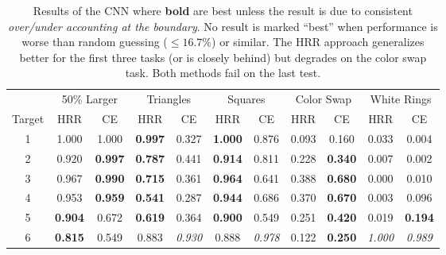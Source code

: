 \documentclass[letterpaper]{article} %
\begin{document}
\begin{table}[!t]
\centering
\begin{tabular}{@{}ccccccccccc@{}}
\toprule
       & \multicolumn{2}{c}{50\% Larger} & \multicolumn{2}{c}{Triangles}   & \multicolumn{2}{c}{Squares}     & \multicolumn{2}{c}{Color Swap} & \multicolumn{2}{c}{White Rings} \\ \cmidrule(r){2-3} \cmidrule(r){4-5} \cmidrule(lr){6-7} \cmidrule(r){8-9} \cmidrule(l){10-11}
Target & HRR            & CE             & HRR            & CE             & HRR            & CE             & HRR       & CE                 & HRR            & CE             \\ \midrule
1      & 1.000          & 1.000          & \textbf{0.997} & 0.327          & \textbf{1.000} & 0.876          & 0.093     & 0.160              & 0.033          & 0.004          \\
2      & 0.920          & \textbf{0.997} & \textbf{0.787} & 0.441          & \textbf{0.914} & 0.811          & 0.228     & \textbf{0.340}     & 0.007          & 0.002          \\
3      & 0.967          & \textbf{0.990} & \textbf{0.715} & 0.361          & \textbf{0.964} & 0.641          & 0.388     & \textbf{0.680}     & 0.000          & 0.010          \\
4      & 0.953          & \textbf{0.959} & \textbf{0.541} & 0.287          & \textbf{0.944} & 0.686          & 0.370     & \textbf{0.670}     & 0.003          & 0.096          \\
5      & \textbf{0.904} & 0.672          & \textbf{0.619} & 0.364          & \textbf{0.900} & 0.549          & 0.251     & \textbf{0.420}     & 0.019          & \textbf{0.194} \\
6      & \textbf{0.815} & 0.549          & 0.883          & \textit{0.930} & 0.888          & \textit{0.978} & 0.122     & \textbf{0.250}     & \textit{1.000} & \textit{0.989} \\ \bottomrule
\end{tabular}
\caption{Results of the CNN where \textbf{bold} are best unless the result is due to consistent \textit{over/under accounting at the boundary}. No result is marked ``best'' when performance is worse than random guessing ($\leq 16.7\%$) or similar. The HRR approach generalizes better for the first three tasks (or is closely behind) but degrades on the color swap task. Both methods fail on the last test.}
\label{tbl:set1}
\end{table}
\end{document}

